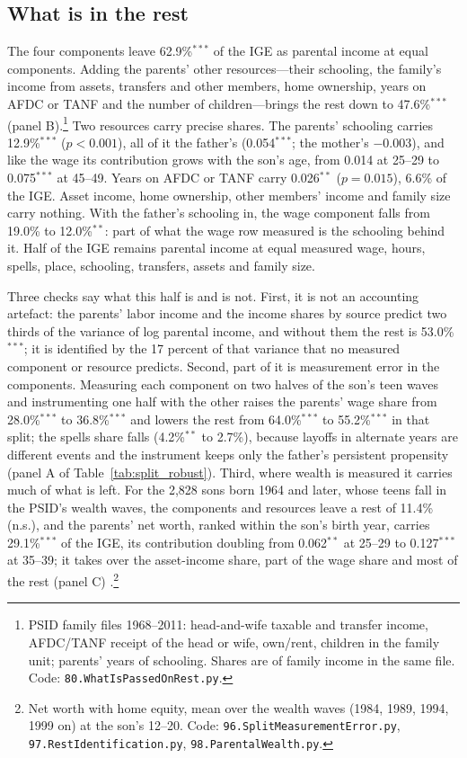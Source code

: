 

\subsection{What is in the rest}

The four components leave 62.9\%$^{***}$ of the IGE as parental income at equal components. Adding the parents' other
resources---their schooling, the family's income from assets, transfers and other members, home ownership, years on
AFDC or TANF and the number of children---brings the rest down to 47.6\%$^{***}$ (panel B).\footnote{PSID family files
1968--2011: head-and-wife taxable and transfer income, AFDC/TANF receipt of the head or wife, own/rent, children in the
family unit; parents' years of schooling. Shares are of family income in the same file. Code:
\texttt{80.WhatIsPassedOnRest.py}.} Two resources carry precise shares. The parents' schooling carries
12.9\%$^{***}$ ($p<0.001$), all of it the father's (0.054$^{***}$; the mother's $-0.003$), and like the wage its
contribution grows with the son's age, from 0.014 at 25--29 to 0.075$^{***}$ at 45--49. Years on AFDC or TANF carry
0.026$^{**}$ ($p = 0.015$), 6.6\% of the IGE. Asset income, home ownership, other members' income and family size carry
nothing. With the father's schooling in, the wage component falls from 19.0\% to 12.0\%$^{**}$: part of what the wage
row measured is the schooling behind it. Half of the IGE remains parental income at equal measured wage, hours, spells,
place, schooling, transfers, assets and family size.

Three checks say what this half is and is not. First, it is not an accounting artefact: the parents' labor income and
the income shares by source predict two thirds of the variance of log parental income, and without them the rest is
53.0\%$^{***}$; it is identified by the 17 percent of that variance that no measured component or resource predicts.
Second, part of it is measurement error in the components. Measuring each component on two halves of the son's teen
waves and instrumenting one half with the other raises the parents' wage share from 28.0\%$^{***}$ to 36.8\%$^{***}$ and
lowers the rest from 64.0\%$^{***}$ to 55.2\%$^{***}$ in that split; the spells share falls (4.2\%$^{**}$ to 2.7\%), because
layoffs in alternate years are different events and the instrument keeps only the father's persistent propensity
(panel A of Table~\ref{tab:split_robust}). Third, where wealth is measured it carries much of what is left. For the
2,828 sons born 1964 and later, whose teens fall in the PSID's wealth waves, the components and resources leave a rest
of 11.4\% (n.s.), and the parents' net worth, ranked within the son's birth year, carries 29.1\%$^{***}$ of the IGE, its
contribution doubling from 0.062$^{**}$ at 25--29 to 0.127$^{***}$ at 35--39; it takes over the asset-income share, part of
the wage share and most of the rest (panel C) \citep{pfeffer2018generations}.\footnote{Net worth with home equity, mean
over the wealth waves (1984, 1989, 1994, 1999 on) at the son's 12--20. Code: \texttt{96.SplitMeasurementError.py},
\texttt{97.RestIdentification.py}, \texttt{98.ParentalWealth.py}.}

